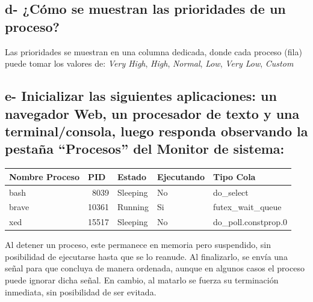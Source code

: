 \documentclass{article}
\begin{document}
\subsection*{d- ¿Cómo se muestran las prioridades de un proceso?}

\noindent
Las prioridades se muestran en una columna dedicada, donde cada proceso (fila) puede tomar los valores de: \textit{Very High}, \textit{High}, \textit{Normal}, 
\textit{Low}, \textit{Very Low}, \textit{Custom}

\subsection*{e- Inicializar las siguientes aplicaciones: un navegador Web, un procesador de texto y una
terminal/consola, luego responda observando la pestaña “Procesos” del Monitor de sistema:}


\begin{table}[htbp]
  \centering
    \begin{tabular}{|lrlll|}
    \toprule
    \rowcolor[rgb]{ .357,  .608,  .835} \textcolor[rgb]{ 1,  1,  1}{\textbf{Nombre Proceso}} & \multicolumn{1}{l}{\textcolor[rgb]{ 1,  1,  1}{\textbf{PID}}} & \textcolor[rgb]{ 1,  1,  1}{\textbf{Estado}} & \textcolor[rgb]{ 1,  1,  1}{\textbf{Ejecutando}} & \textcolor[rgb]{ 1,  1,  1}{\textbf{Tipo Cola}} \\
    \midrule
    \rowcolor[rgb]{ .867,  .922,  .969} bash  & 8039  & Sleeping & No    & do\_select \\
    \midrule
    brave & 10361 & Running & Si    & futex\_wait\_queue \\
    \midrule
    \rowcolor[rgb]{ .867,  .922,  .969} xed   & 15517 & Sleeping & No    & do\_poll.constprop.0 \\
    \bottomrule
    \end{tabular}%
  \label{tab:monitor_sistema}%
\end{table}%
 
 \begin{warn}[]
    \noindent
    Al detener un proceso, este permanece en memoria pero suspendido, sin posibilidad de ejecutarse hasta que se lo 
    reanude. Al finalizarlo, se envía una señal para que concluya de manera ordenada, aunque en algunos casos el
    proceso puede ignorar dicha señal. En cambio, al matarlo se fuerza su terminación inmediata, sin posibilidad de ser evitada.
 \end{warn}
\end{document}
